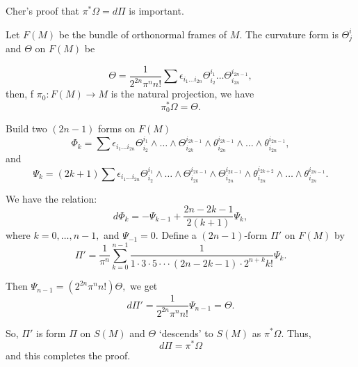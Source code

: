 Cher's proof that $\pi^*\Omega=d\Pi$ is important.

Let $F(M)$ be the bundle of orthonormal frames of $M$.
The curvature form is $\Theta_j^i$ and $\Theta$ on $F(M)$
be

$$\Theta=\frac{1}{2^{2n}\pi^n n!}\sum \epsilon_{i_1\ldots i_{2n}}\Theta_{i_2}^{i_1}\ldots \Theta_{i_{2n}}^{i_{2n-1}},$$
then, f $\pi_0:F(M)\rightarrow M$ is the natural projection, we have
$$\pi_0^*\Omega =\Theta.$$

Build two $(2n-1)$ forms on $F(M)$
$$\Phi_k=\sum \epsilon_{i_1\ldots i_{2n}} \Theta_{i_2}^{i_1}\land \ldots\land \Theta_{i_{2k}}^{i_{2k-1}}\land \theta_{i_{2n}}^{i_{2k-1}}\land \ldots \land \theta_{i_{2n}}^{i_{2n-1}},$$
and
$$\Psi_k=(2k+1)\sum \epsilon_{i_1\ldots i_{2n}} \Theta_{i_2}^{i_1}\land \ldots\land \Theta_{i_{2k}}^{i_{2k-1}}\land \Theta_{i_{2n}}^{i_{2k-1}}\land \theta_{i_{2n}}^{i_{2k+2}}\land \ldots \land \theta_{i_{2n}}^{i_{2n-1}}.$$

We have the relation:
$$d\Phi_k=-\Psi_{k-1}+\frac{2n-2k-1}{2(k+1)}\Psi_k,$$
where $k=0,\ldots, n-1,$ and $\Psi_{-1}=0.$
Define a $(2n-1)$-form $\Pi'$ on $F(M)$ by
$$\Pi'=\frac{1}{\pi^n}\sum_{k=0}^{n-1}\frac{1}{1\cdot 3\cdot 5\cdot \cdot \cdot (2n-2k-1)\cdot 2^{n+k}k!}\Psi_k.$$

Then $\Psi_{n-1}=(2^{2n}\pi^n n!)\Theta,$ we get
$$d\Pi'=\frac{1}{2^{2n}\pi^n n!}\Psi_{n-1}=\Theta.$$

So, $\Pi'$ is form $\Pi$ on $S(M)$ and $\Theta$ `descends' to $S(M)$ as $\pi^*\Omega.$
Thus,
$$d\Pi=\pi^*\Omega$$
and this completes the proof.
